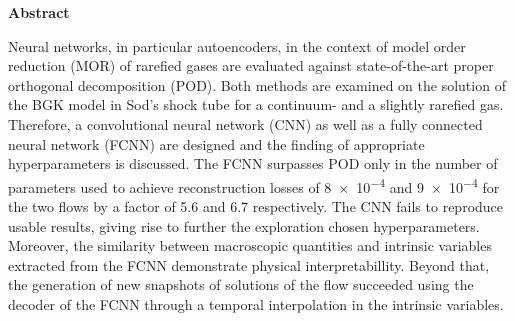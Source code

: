 

%
%
{
\pagestyle{empty}
\begin{center}
{\sffamily \bfseries\Large Abstract}\\
\end{center}%
\vspace{1cm}
%
Neural networks, in particular autoencoders, in the context of model order reduction (MOR) of rarefied gases are evaluated against state-of-the-art proper orthogonal decomposition (POD). Both methods are examined on the solution of the BGK model in Sod's shock tube for a continuum- and a slightly rarefied gas. Therefore, a convolutional neural network (CNN) as well as a fully connected neural network (FCNN) are designed and the finding of appropriate hyperparameters is discussed. The FCNN surpasses POD only in the number of parameters used to achieve reconstruction losses of \num{8e-4} and \num{9e-4} for the two flows by a factor of 5.6 and 6.7 respectively. The CNN fails to reproduce usable results, giving rise to further the exploration chosen hyperparameters. Moreover, the similarity between macroscopic quantities and intrinsic variables extracted from the FCNN demonstrate physical interpretabillity. Beyond that, the generation of new snapshots of solutions of the flow succeeded using the decoder of the FCNN through a temporal interpolation in the intrinsic variables.
\vspace{1.5cm}

}

